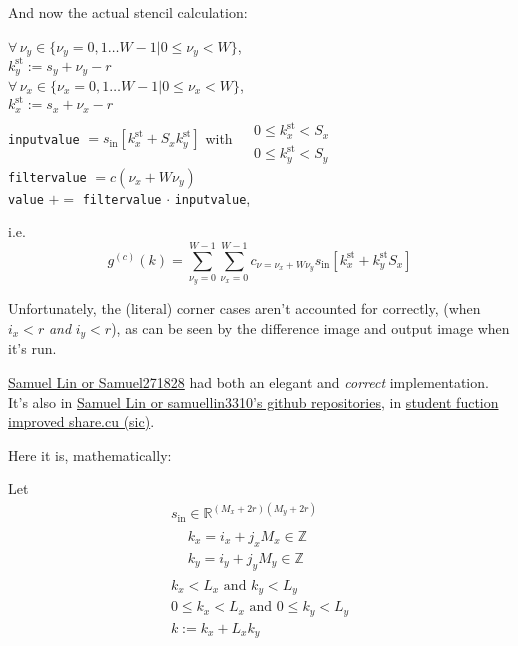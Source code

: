 \documentclass[10pt]{amsart}
\begin{document}
\begin{multicols*}{2}
And now the actual stencil calculation:

$\forall \, \nu_y \in \lbrace \nu_y = 0 , 1 \dots W-1 | 0 \leq \nu_y < W \rbrace$, \\
\phantom{ \qquad \, } $k_y^{\text{st}} := s_y + \nu_y - r$ \\
\phantom{ \qquad \, } $\forall \, \nu_x \in \lbrace \nu_x = 0 , 1 \dots W-1 | 0 \leq \nu_x < W \rbrace$, \\
\phantom{ \qquad \qquad \, } $k_x^{\text{st}} := s_x + \nu_x -r $ \\
\phantom{ \qquad \qquad \, } \verb|inputvalue| $=s_{\text{in}}[k^{\text{st}}_x + S_x k_y^{\text{st}}]$ with $\begin{aligned} & \quad \\
  & 0 \leq k_x^{\text{st}} < S_x \\ 
  & 0 \leq k_y^{\text{st}} < S_y  \end{aligned}$ \\
\phantom{ \qquad \qquad \, } \verb|filtervalue| $ = c(\nu_x + W\nu_y)$  \\
\phantom{ \qquad \qquad \, } \verb|value| $+=$ \verb|filtervalue| $\cdot$ \verb|inputvalue|,

i.e.
\[
g^{(c)}(k) = \sum_{\nu_y=0}^{W-1} \sum_{\nu_x =0}^{W-1} c_{\nu = \nu_x + W \nu_y} s_{\text{in}}[k_x^{\text{st}} + k_y^{\text{st}}S_x]
\]


Unfortunately, the (literal) corner cases aren't accounted for correctly, (when $i_x < r$ \emph{and } $i_y<r$), as can be seen by the difference image and output image when it's run.

\href{https://discussions.udacity.com/users/Samuel271828}{Samuel Lin or Samuel271828} had both an elegant and \emph{correct} implementation.  It's also in \href{https://github.com/samuellin3310}{Samuel Lin or samuellin3310's github repositories}, in \href{https://github.com/samuellin3310/ro-to-Parallel-Programming_set2/blob/master/student_fuction_improved_share.cu}{student fuction improved share.cu (sic)}.  


Here it is, mathematically:

\hrulefill

Let
\[
\begin{gathered}
  s_{\text{in}} \in \mathbb{R}^{(M_x + 2r)(M_y + 2r) } \\
  \begin{aligned}
    & k_x = i_x + j_x M_x \in \mathbb{Z} \\ 
    & k_y = i_y + j_y M_y \in \mathbb{Z}  
    \end{aligned} \\
  k_x < L_x \text{ and } k_y < L_y \\
  0 \leq k_x < L_x \text{ and } 0 \leq k_y < L_y \\
  k := k_x + L_x k_y
\end{gathered}
\]


\end{multicols*}
\end{document}
